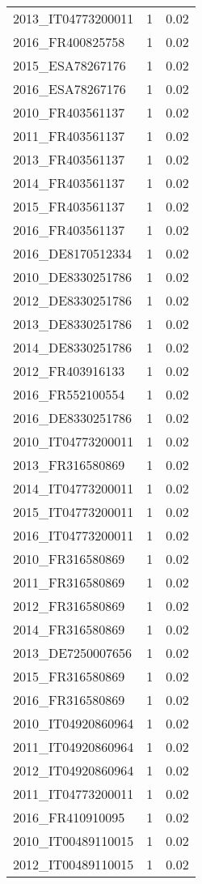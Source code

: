 \begin{table*}[htbp]
\begin{tabular}{lrr}
2013_IT04773200011 & 1 & 0.02 \\
2016_FR400825758 & 1 & 0.02 \\
2015_ESA78267176 & 1 & 0.02 \\
2016_ESA78267176 & 1 & 0.02 \\
2010_FR403561137 & 1 & 0.02 \\
2011_FR403561137 & 1 & 0.02 \\
2013_FR403561137 & 1 & 0.02 \\
2014_FR403561137 & 1 & 0.02 \\
2015_FR403561137 & 1 & 0.02 \\
2016_FR403561137 & 1 & 0.02 \\
2016_DE8170512334 & 1 & 0.02 \\
2010_DE8330251786 & 1 & 0.02 \\
2012_DE8330251786 & 1 & 0.02 \\
2013_DE8330251786 & 1 & 0.02 \\
2014_DE8330251786 & 1 & 0.02 \\
2012_FR403916133 & 1 & 0.02 \\
2016_FR552100554 & 1 & 0.02 \\
2016_DE8330251786 & 1 & 0.02 \\
2010_IT04773200011 & 1 & 0.02 \\
2013_FR316580869 & 1 & 0.02 \\
2014_IT04773200011 & 1 & 0.02 \\
2015_IT04773200011 & 1 & 0.02 \\
2016_IT04773200011 & 1 & 0.02 \\
2010_FR316580869 & 1 & 0.02 \\
2011_FR316580869 & 1 & 0.02 \\
2012_FR316580869 & 1 & 0.02 \\
2014_FR316580869 & 1 & 0.02 \\
2013_DE7250007656 & 1 & 0.02 \\
2015_FR316580869 & 1 & 0.02 \\
2016_FR316580869 & 1 & 0.02 \\
2010_IT04920860964 & 1 & 0.02 \\
2011_IT04920860964 & 1 & 0.02 \\
2012_IT04920860964 & 1 & 0.02 \\
2011_IT04773200011 & 1 & 0.02 \\
2016_FR410910095 & 1 & 0.02 \\
2010_IT00489110015 & 1 & 0.02 \\
2012_IT00489110015 & 1 & 0.02 \\

\end{tabular}
\end{table*}
